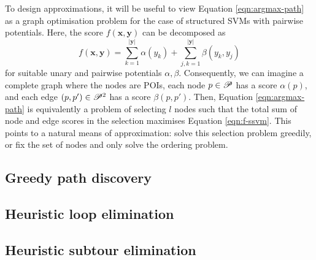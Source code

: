 
To design approximations, it will be useful to view Equation \ref{eqn:argmax-path} as a graph optimisation problem
for the case of structured SVMs with pairwise potentials.
Here, the score $f(\mathbf{x}, \mathbf{y})$ can be decomposed as
\begin{equation}
	\label{eqn:f-ssvm}
	f(\mathbf{x}, \mathbf{y}) = \sum_{k = 1}^{|\mathbf{y}|} \alpha( y_k ) + \sum_{j, k = 1}^{|\mathbf{y}|} \beta( y_k, y_j )
\end{equation}
for suitable unary and pairwise potentials $\alpha, \beta$.
Consequently, we can imagine a complete graph where the nodes are POIs, each node $p \in \mathscr{P}$ has a score $\alpha( p )$, and each edge $(p, p') \in \mathscr{P}^2$ has a score $\beta( p, p' )$.
Then, Equation \ref{eqn:argmax-path} is equivalently a problem of selecting $l$ nodes such that
the total sum of node and edge scores in the selection maximises Equation \ref{eqn:f-ssvm}.
This points to a natural means of approximation: solve this selection problem greedily, or fix the set of nodes and only solve the ordering problem.

\subsection{Greedy path discovery}
\label{sec:greedy}


\subsection{Heuristic loop elimination}
\label{sec:loop-elim}


\subsection{Heuristic subtour elimination}
\label{sec:christofides}

